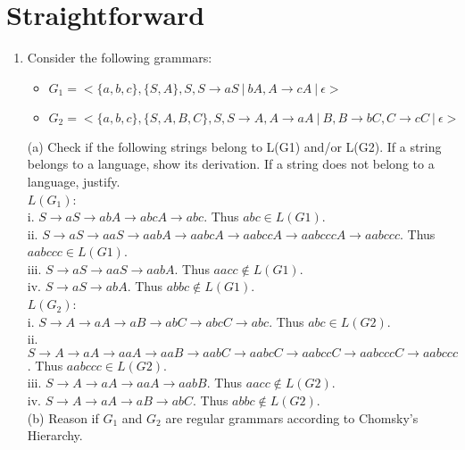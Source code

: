\documentclass[a4paper]{article}
\begin{document}
\section{Straightforward}
\begin{enumerate}
\item Consider the following grammars:
\begin{itemize}
\item $G_1 =< \{a, b, c\}, \{S, A\}, S, S \rightarrow aS\ |\ bA, A \rightarrow cA\ |\ \epsilon >$
\item $G_2 =< \{a, b, c\}, \{S, A, B, C\}, S, S \rightarrow A, A \rightarrow aA\ |\ B, B \rightarrow bC, C \rightarrow cC\ |\ \epsilon >$
\end{itemize}

(a) Check if the following strings belong to L(G1) and/or L(G2). If a string belongs to a language,
show its derivation. If a string does not belong to a language, justify.
\\

$L(G_1)$:\\
i. $S \rightarrow aS \rightarrow abA \rightarrow abcA \rightarrow abc$. Thus $abc \in L(G1)$.\\
ii. $S \rightarrow aS \rightarrow aaS \rightarrow aabA \rightarrow aabcA \rightarrow aabccA \rightarrow aabcccA \rightarrow aabccc$. Thus $aabccc \in L(G1)$.\\
iii. $S \rightarrow aS \rightarrow aaS \rightarrow aabA$. Thus $aacc \notin L(G1)$.\\
iv. $S \rightarrow aS \rightarrow abA$. Thus $abbc \notin L(G1)$.\\

$L(G_2)$:\\
i. $S \rightarrow A \rightarrow aA \rightarrow aB \rightarrow abC \rightarrow abcC \rightarrow abc$. Thus $abc \in L(G2)$.\\
ii. $S \rightarrow A \rightarrow aA \rightarrow aaA \rightarrow aaB \rightarrow aabC \rightarrow aabcC \rightarrow aabccC \rightarrow aabcccC \rightarrow aabccc$. Thus $aabccc \in L(G2)$.\\
iii. $S \rightarrow A \rightarrow aA \rightarrow aaA \rightarrow aabB$. Thus $aacc \notin L(G2)$.\\
iv. $S \rightarrow A \rightarrow aA \rightarrow aB \rightarrow abC$. Thus $abbc \notin L(G2)$.\\

(b) Reason if $G_1$ and $G_2$ are regular grammars according to Chomsky's Hierarchy.\\


\end{enumerate}
\end{document}
